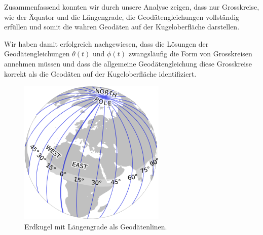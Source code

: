 Zusammenfassend konnten wir durch unsere Analyse zeigen, dass nur Grosskreise, wie der Äquator und die Längengrade, die Geodätengleichungen vollständig erfüllen und somit die wahren Geodäten auf der Kugeloberfläche darstellen.

Wir haben damit erfolgreich nachgewiesen, dass die Lösungen der Geodätengleichungen $\theta(t)$ und $\phi(t)$ zwangsläufig die Form von Grosskreisen annehmen müssen und dass die allgemeine Geodätengleichung diese Grosskreise korrekt als die Geodäten auf der Kugeloberfläche identifiziert.

\begin{figure}
	\centering
	\includegraphics[width=7cm]{papers/geodaeten/Abbildungen/Standardverfahren/StaKugelLaengengrade}
	\caption{Erdkugel mit Längengrade als Geodätenlinen.}
	\label{geodaeten:figure:Standardverfahren:Laengengrade}
\end{figure}